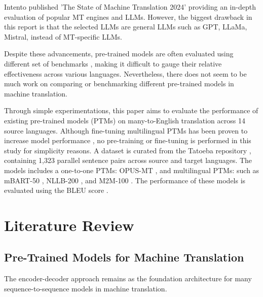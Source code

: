 \documentclass[a4paper]{article}
\begin{document}
Intento published 'The State of Machine Translation 2024' \cite{intento-2020} providing an in-depth evaluation of popular MT engines and LLMs. However, the biggest drawback in this report is that the selected LLMs are general LLMs such as GPT, LLaMa, Mistral, instead of MT-specific LLMs.

Despite these advancements, pre-trained models are often evaluated using different set of benchmarks \cite{liu-2020-mbart,nllb200-2020,fan-2020-m2m100,wei-2023-polylm}, making it difficult to gauge their relative effectiveness across various languages. Nevertheless, there does not seem to be much work on comparing or benchmarking different pre-trained models in machine translation.

Through simple experimentations, this paper aims to evaluate the performance of existing pre-trained models (PTMs) on many-to-English translation across 14 source languages. Although fine-tuning multilingual PTMs has been proven to increase model performance \cite{cooper-stickland-2021-recipes}, no pre-training or fine-tuning is performed in this study for simplicity reasons. A dataset is curated from the Tatoeba repository \cite{tatoeba}, containing 1,323 parallel sentence pairs across source and target languages. The models includes a one-to-one PTMs: OPUS-MT \cite{tiedemann-2023-democratizing,tiedemann-2020-opus-mt}, and multilingual PTMs: such as mBART-50 \cite{liu-2020-mbart}, NLLB-200 \cite{nllb200-2020}, and M2M-100 \cite{fan-2020-m2m100}. The performance of these models is evaluated using the BLEU score \cite{papieni-2002-bleu}.




\section{Literature Review}

\subsection{Pre-Trained Models for Machine Translation}

The encoder-decoder approach \cite{cho-2014-properties} remains as the foundation architecture for many sequence-to-sequence models in machine translation.
\end{document}
